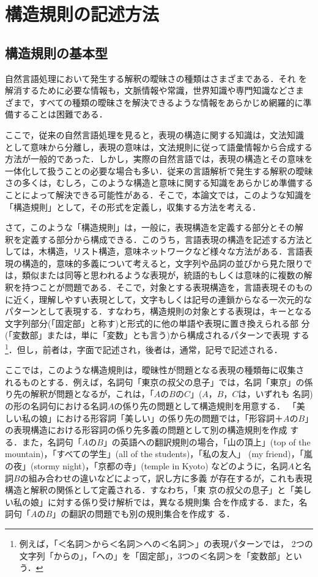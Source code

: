\section{構造規則の記述方法}
\subsection{構造規則の基本型}
自然言語処理において発生する解釈の曖昧さの種類はさまざまである．それ
を解消するために必要な情報も，文脈情報や常識，世界知識や専門知識などさま
ざまで，すべての種類の曖昧さを解決できるような情報をあらかじめ網羅的に準
備することは困難である．

ここで，従来の自然言語処理を見ると，表現の構造に関する知識は，文法知識
として意味から分離し，表現の意味は，文法規則に従って語彙情報から合成する
方法が一般的であった．しかし，実際の自然言語では，表現の構造とその意味を
一体化して扱うことの必要な場合も多い．従来の言語解析で発生する解釈の曖昧
さの多くは，むしろ，このような構造と意味に関する知識をあらかじめ準備する
ことによって解決できる可能性がある．そこで，本論文では，このような知識を
「構造規則」として，その形式を定義し，収集する方法を考える．

さて，このような「構造規則」は，一般に，表現構造を定義する部分とその解
釈を定義する部分から構成できる．このうち，言語表現の構造を記述する方法と
しては，木構造，リスト構造，意味ネットワークなど様々な方法がある．言語表
現の構造的，意味的多義について考えると，文字列や品詞の並びから見た限りで
は，類似または同等と思われるような表現が，統語的もしくは意味的に複数の解
釈を持つことが問題である．そこで，対象とする表現構造を，言語表現そのもの
に近く，理解しやすい表現として，文字もしくは記号の連鎖からなる一次元的な
パターンとして表現する．すなわち，構造規則の対象とする表現は，キーとなる
文字列部分(「固定部」と称す)と形式的に他の単語や表現に置き換えられる部
分(「変数部」または，単に「変数」とも言う)から構成されるパターンで表現
する\footnote{例えば，「＜名詞＞から＜名詞＞への＜名詞＞」の表現パターンでは，
2つの文字列「からの」，「への」を「固定部」，3つの＜名詞＞を「変数部」とい
う．}．但し，前者は，字面で記述され，後者は，通常，記号で記述される．　

ここでは，このような構造規則は，曖昧性が問題となる表現の種類毎に収集さ
れるものとする．例えば，名詞句「東京の叔父の息子」では，名詞「東京」の係
り先の解釈が問題となるが，これは，「$AのBのC$」($A，B，C$は，いずれも
名詞)の形の名詞句における名詞$A$の係り先の問題として構造規則を用意する．
「美しい私の娘」における形容詞「美しい」の係り先の問題では，「形容詞＋$A
のB$」の表現構造における形容詞の係り先多義の問題として別の構造規則を作成
する．また，名詞句「$AのB$」の英語への翻訳規則の場合，「山の頂上」(top
of the mountain)，「すべての学生」(all of the students)，「私の友人」
(my friend)，「嵐の夜」(stormy night)，「京都の寺」(temple in Kyoto)
などのように，名詞$A$と名詞$B$の組み合わせの違いなどによって，訳し方に多義
が存在するが，これも表現構造と解釈の関係として定義される．すなわち，「東
京の叔父の息子」と「美しい私の娘」に対する係り受け解析では，異なる規則集
合を作成する．また，名詞句「$A$の$B$」の翻訳の問題でも別の規則集合を作成す
る．

